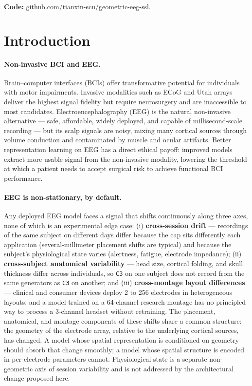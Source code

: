 \documentclass[11pt]{article}
\begin{document}
\medskip
\noindent\textbf{Code:}
\href{https://github.com/tianxin-scu/geometric-eeg-ssl}{github.com/tianxin-scu/geometric-eeg-ssl}.

\section{Introduction}
\label{sec:intro}

\paragraph{Non-invasive BCI and EEG.}
Brain--computer interfaces (BCIs) offer transformative potential for
individuals with motor impairments. Invasive modalities such as ECoG and Utah
arrays deliver the highest signal fidelity but require neurosurgery and are
inaccessible to most candidates. Electroencephalography (EEG) is the natural
non-invasive alternative --- safe, affordable, widely deployed, and capable
of millisecond-scale recording --- but its scalp signals are noisy, mixing
many cortical sources through volume conduction and contaminated by muscle
and ocular artifacts. Better representation learning on EEG has a direct
ethical payoff: improved models extract more usable signal from the
non-invasive modality, lowering the threshold at which a patient needs to
accept surgical risk to achieve functional BCI performance.

\paragraph{EEG is non-stationary, by default.}
Any deployed EEG model faces a signal that shifts continuously along three
axes, none of which is an experimental edge case:
(i) \textbf{cross-session drift} --- recordings of the same subject on
different days differ because the cap sits differently each application
(several-millimeter placement shifts are typical) and because the subject's
physiological state varies (alertness, fatigue, electrode impedance);
(ii) \textbf{cross-subject anatomical variability} --- head size, cortical
folding, and skull thickness differ across individuals, so \texttt{C3} on
one subject does not record from the same generators as \texttt{C3} on
another; and
(iii) \textbf{cross-montage layout differences} --- clinical and consumer
devices deploy 2 to 256 electrodes in heterogeneous layouts, and a model
trained on a 64-channel research montage has no principled way to process a
3-channel headset without retraining.
The placement, anatomical, and montage components of these shifts share a
common structure: the geometry of the electrode array, relative to the
underlying cortical sources, has changed. A model whose spatial
representation is conditioned on geometry should absorb that change smoothly;
a model whose spatial structure is encoded in per-electrode parameters
cannot. Physiological state is a separate non-geometric axis of session
variability and is not addressed by the architectural change proposed here.
\end{document}
